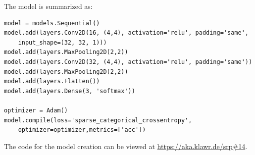 The model is summarized as:

\begin{lstlisting}
model = models.Sequential()
model.add(layers.Conv2D(16, (4,4), activation='relu', padding='same',
    input_shape=(32, 32, 1)))
model.add(layers.MaxPooling2D(2,2))
model.add(layers.Conv2D(32, (4,4), activation='relu', padding='same'))
model.add(layers.MaxPooling2D(2,2))
model.add(layers.Flatten())
model.add(layers.Dense(3, 'softmax'))

optimizer = Adam()
model.compile(loss='sparse_categorical_crossentropy',
    optimizer=optimizer,metrics=['acc'])
\end{lstlisting}

The code for the model creation can be viewed at \url{https://aka.klawr.de/srp\#14}.
